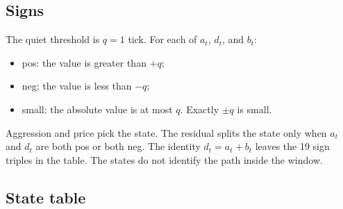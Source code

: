 \documentclass[11pt]{article}
\begin{document}
\subsection{Signs}

The quiet threshold is $q=1$ tick. For each of $a_t$, $d_t$, and $b_t$:
\begin{itemize}
    \item pos: the value is greater than $+q$;
    \item neg: the value is less than $-q$;
    \item small: the absolute value is at most $q$. Exactly $\pm q$ is small.
\end{itemize}

Aggression and price pick the state. The residual splits the state only when $a_t$ and $d_t$ are both pos or both neg. The identity $d_t=a_t+b_t$ leaves the 19 sign triples in the table. The states do not identify the path inside the window.

\subsection{State table}
\end{document}
